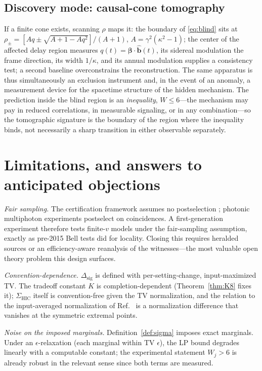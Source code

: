 \documentclass[10pt,twocolumn]{article}
\newcommand{\Sig}{\Sigma_{\mathrm{HIC}}}
\newcommand{\Dsig}{\Delta_{\mathrm{sig}}}
\begin{document}
\subsection{Discovery mode: causal-cone tomography}

If a finite cone exists, scanning $\rho$ maps it: the boundary of \eqref{eq:blind} sits at $\rho_\pm = [Aq \pm \sqrt{A+1-Aq^2}]/(A+1)$, $A=\gamma^2(\kappa^2-1)$; the center of the affected delay region measures $q(t)=\boldsymbol\beta\cdot\hat{\mathbf b}(t)$, its sidereal modulation the frame direction, its width $1/\kappa$, and its annual modulation supplies a consistency test; a second baseline overconstrains the reconstruction. The same apparatus is thus simultaneously an exclusion instrument and, in the event of an anomaly, a measurement device for the spacetime structure of the hidden mechanism. The prediction inside the blind region is an \emph{inequality}, $W\le6$---the mechanism may pay in reduced correlations, in measurable signaling, or in any combination---so the tomographic signature is the boundary of the region where the inequality binds, not necessarily a sharp transition in either observable separately.

\section{Limitations, and answers to anticipated objections}
\label{sec:limits}

\emph{Fair sampling.} The certification framework assumes no postselection \cite{Li2026}; photonic multiphoton experiments postselect on coincidences. A first-generation experiment therefore tests finite-$v$ models under the fair-sampling assumption, exactly as pre-2015 Bell tests did for locality. Closing this requires heralded sources or an efficiency-aware reanalysis of the witnesses---the most valuable open theory problem this design surfaces.

\emph{Convention-dependence.} $\Dsig$ is defined with per-setting-change, input-maximized TV. The tradeoff constant $K$ is completion-dependent (Theorem~\ref{thm:K8} fixes it); $\Sig$ itself is convention-free given the TV normalization, and the relation to the input-averaged normalization of Ref.~\cite{Brito2018} is a normalization difference that vanishes at the symmetric extremal points.

\emph{Noise on the imposed marginals.} Definition~\ref{def:sigma} imposes exact marginals. Under an $\epsilon$-relaxation (each marginal within TV $\epsilon$), the LP bound degrades linearly with a computable constant; the experimental statement $W_j>6$ is already robust in the relevant sense since both terms are measured.
\end{document}
